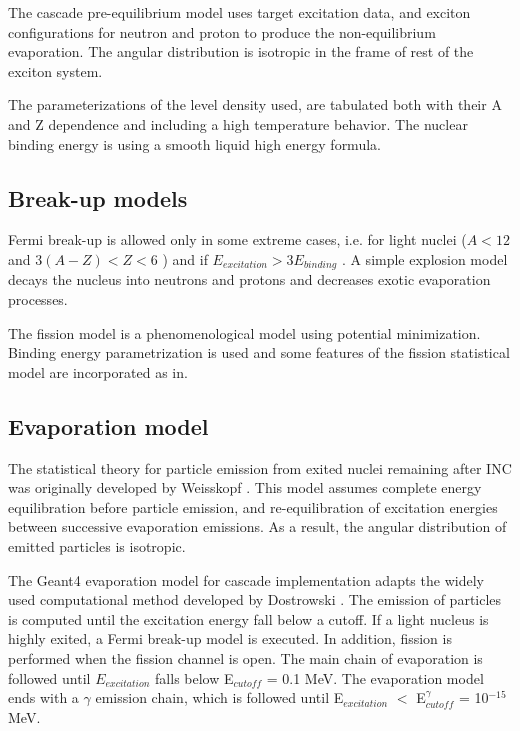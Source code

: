 \documentclass[twocolumn,twoside,slac,floatfix]{revtex4}
\begin{document}
The cascade pre-equilibrium model uses target excitation data, and
exciton configurations for neutron and proton to produce the non-equilibrium evaporation.
The angular distribution is isotropic in the frame of rest of the exciton system.

The parameterizations of the level density used, are tabulated both with their A and Z dependence and including a high temperature 
behavior. The nuclear binding energy is using a smooth liquid high energy formula.


\subsection{Break-up models}


Fermi break-up is allowed only in some extreme cases, i.e. for light nuclei ($A < 12$ and  $3 (A - Z) < Z < 6$ ) and 
if $E_{excitation} > 3 E_{binding}$ .
A simple explosion model decays the nucleus into neutrons and protons and decreases exotic evaporation processes.

The fission model is a phenomenological model using potential minimization. 
Binding energy parametrization is used and some features of the fission statistical model are incorporated as in\cite{fong69}.

\subsection{Evaporation model}

The statistical theory for particle emission from exited nuclei remaining after INC was originally developed by Weisskopf \cite{weisskopf37}. 
This model assumes complete energy equilibration before particle emission, and re-equilibration of excitation energies between successive evaporation emissions. 
As a result, the angular distribution of emitted particles is isotropic.

The Geant4 evaporation model for cascade implementation adapts the widely used computational method developed by Dostrowski \cite{dostrovsky59, dostrovsky60}.
The emission of particles is computed until the excitation energy fall below a cutoff. 
If a light nucleus is highly exited, a Fermi break-up model is executed. In addition, fission is performed when the fission channel is open. 
The main chain of evaporation is followed until  $E_{excitation}$ falls below E$_{cutoff}$ = 0.1 MeV. 
The evaporation model ends with a $\gamma$ emission chain, which is followed until E$_{excitation}$ $<$ E$^{\gamma}_{cutoff}$ = 10$^{-15}$ MeV.
\end{document}
